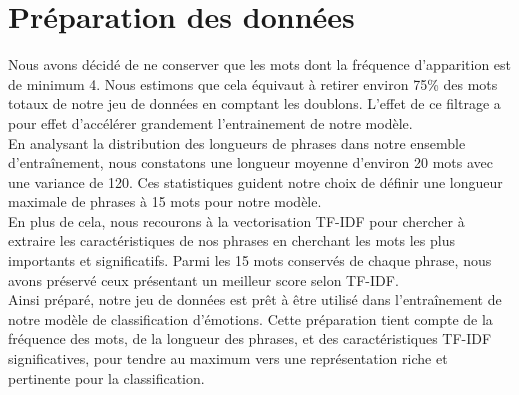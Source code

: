 \documentclass{article}
\begin{document}
\section{Préparation des données}
Nous avons décidé de ne conserver que les mots dont la fréquence d’apparition est de minimum 4. Nous estimons que cela équivaut à retirer environ 75\% des mots totaux de notre jeu de données en comptant les doublons. L’effet de ce filtrage a pour effet d’accélérer grandement l’entrainement de notre modèle. \\
En analysant la distribution des longueurs de phrases dans notre ensemble d'entraînement, nous constatons une longueur moyenne d'environ 20 mots avec une variance de 120. Ces statistiques guident notre choix de définir une longueur maximale de phrases à 15 mots pour notre modèle. \\
En plus de cela, nous recourons à la vectorisation TF-IDF pour chercher à extraire les caractéristiques de nos phrases en cherchant les mots les plus importants et significatifs. Parmi les 15 mots conservés de chaque phrase, nous avons préservé ceux présentant un meilleur score selon TF-IDF. \\
Ainsi préparé, notre jeu de données est prêt à être utilisé dans l'entraînement de notre modèle de classification d'émotions. Cette préparation tient compte de la fréquence des mots, de la longueur des phrases, et des caractéristiques TF-IDF significatives, pour tendre au maximum vers une représentation riche et pertinente pour la classification.
\end{document}
